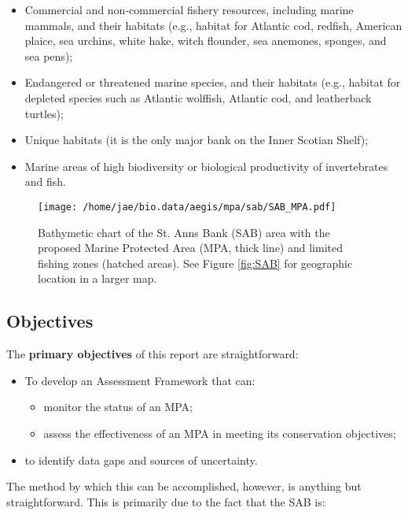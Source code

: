 \documentclass[letterpaper,portrait,11pt]{scrartcl}
\numberwithin{equation}{section}    %
\numberwithin{figure}{section}    %
\numberwithin{table}{section}       %
\begin{document}
\begin{itemize}
	\item Commercial and non-commercial fishery resources, including marine mammals, and their habitats (e.g., habitat for Atlantic cod, redfish, American plaice, sea urchins, white hake, witch flounder, sea anemones, sponges, and sea pens);
  \item Endangered or threatened marine species, and their habitats (e.g., habitat for depleted species such as Atlantic wolffish, Atlantic cod, and leatherback turtles);
  \item Unique habitats (it is the only major bank on the Inner Scotian Shelf);
  \item Marine areas of high biodiversity or biological productivity of invertebrates and fish.
\end{itemize}

\begin{figure}[h]
  \centering
  \texttt{[image: /home/jae/bio.data/aegis/mpa/sab/SAB\_MPA.pdf]}
  \caption{Bathymetic chart of the St. Anns Bank (SAB) area with the proposed Marine Protected Area (MPA, thick line) and limited fishing zones (hatched areas). See Figure \ref{fig:SAB} for geographic location in a larger map.}
  \label{fig:SABCloseup}
\end{figure}

\subsection{Objectives}

The \textbf{primary objectives} of this report are straightforward:

\begin{itemize}
	\item To develop an Assessment Framework that can:
  \begin{itemize}
    \item	monitor the status of an MPA;
  	\item assess the effectiveness of an MPA in meeting its conservation objectives;
  \end{itemize}
  \item to identify data gaps and sources of uncertainty. 
\end{itemize}

The method by which this can be accomplished, however, is anything but straightforward. This is primarily due to the fact that the SAB is:
\end{document}
